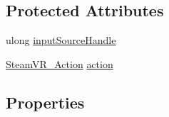 \subsection*{Protected Attributes}
\begin{DoxyCompactItemize}
\item 
ulong \mbox{\hyperlink{class_valve_1_1_v_r_1_1_steam_v_r___action___source_a427286fbd3c70da9333dc3f513e30e1c}{input\+Source\+Handle}}
\item 
\mbox{\hyperlink{class_valve_1_1_v_r_1_1_steam_v_r___action}{Steam\+V\+R\+\_\+\+Action}} \mbox{\hyperlink{class_valve_1_1_v_r_1_1_steam_v_r___action___source_aa38bfb4ea2779a73aa3285f861e2462e}{action}}
\end{DoxyCompactItemize}
\subsection*{Properties}
